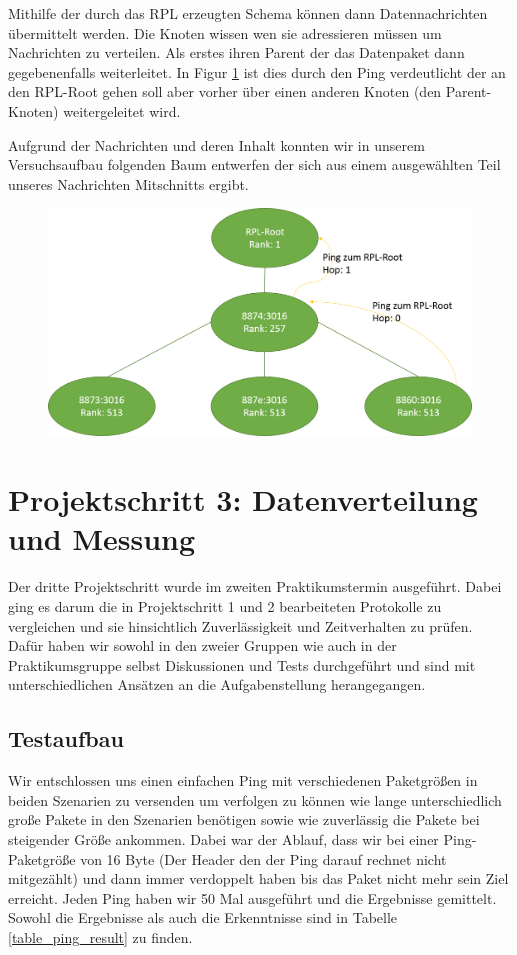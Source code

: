 \documentclass[]{scrartcl}
\begin{document}
Mithilfe der durch das RPL erzeugten Schema können dann Datennachrichten übermittelt werden. Die Knoten wissen wen sie adressieren müssen um Nachrichten zu verteilen. Als erstes ihren Parent der das Datenpaket dann gegebenenfalls weiterleitet. In Figur \ref{fig:RPL_Baum}  ist dies durch den Ping verdeutlicht der an den RPL-Root gehen soll aber vorher über einen anderen Knoten (den Parent-Knoten) weitergeleitet wird.

Aufgrund der Nachrichten und deren Inhalt konnten wir in unserem Versuchsaufbau folgenden Baum entwerfen der sich aus einem ausgewählten Teil unseres Nachrichten Mitschnitts ergibt.

\begin{figure}[H]
	\centering
	\includegraphics[width=1\linewidth]{RPL_Baum.png}
	\label{fig:RPL_Baum}
\end{figure}


\section{Projektschritt 3: Datenverteilung und Messung}
Der dritte Projektschritt wurde im zweiten Praktikumstermin ausgeführt. Dabei ging es darum die in Projektschritt 1 und 2 bearbeiteten Protokolle zu vergleichen und sie hinsichtlich Zuverlässigkeit und Zeitverhalten zu prüfen. Dafür haben wir sowohl in den zweier Gruppen wie auch in der Praktikumsgruppe selbst Diskussionen und Tests durchgeführt und sind mit unterschiedlichen Ansätzen an die Aufgabenstellung herangegangen.

\subsection{Testaufbau}
Wir entschlossen uns einen einfachen Ping mit verschiedenen Paketgrößen in beiden Szenarien zu versenden um verfolgen zu können wie lange unterschiedlich große Pakete in den Szenarien benötigen sowie wie zuverlässig die Pakete bei steigender Größe ankommen.
Dabei war der Ablauf, dass wir bei einer Ping-Paketgröße von 16 Byte (Der Header den der Ping darauf rechnet nicht mitgezählt) und dann immer verdoppelt haben bis das Paket nicht mehr sein Ziel erreicht. Jeden Ping haben wir 50 Mal ausgeführt und die Ergebnisse gemittelt. Sowohl die Ergebnisse als auch die Erkenntnisse sind in Tabelle \ref{table_ping_result} zu finden.
\end{document}
